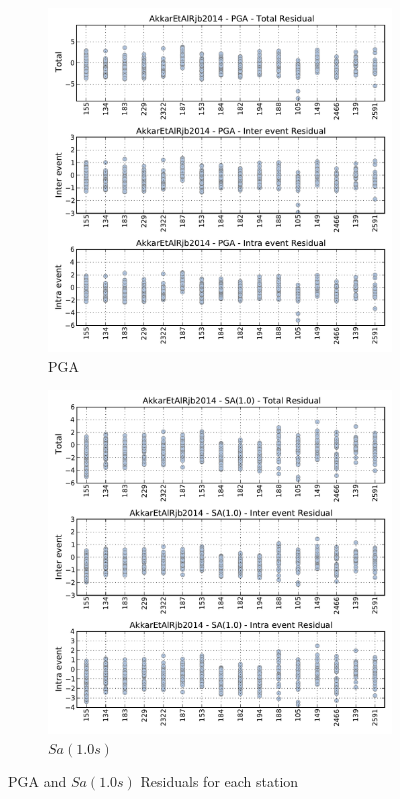\begin{figure}[htb]
  \centering
  \begin{subfigure}[b]{0.49\textwidth}
      \includegraphics[width=\textwidth]{./figures/residuals/Single_Station_Residuals_PGA.pdf}
      \caption{PGA}
      \label{fig:ssa_residual_pga}
  \end{subfigure}
    \begin{subfigure}[b]{0.49\textwidth}
      \includegraphics[width=\textwidth]{./figures/residuals/Single_Station_Residuals_Sa1.pdf}
      \caption{$Sa \left( {1.0s} \right)$}
      \label{fig:ssa_residual_sa1}
  \end{subfigure}
  \caption{PGA and $Sa \left( {1.0 s} \right)$ Residuals for each station}
  \label{fig:ssa_normalised_residuals}
\end{figure}

